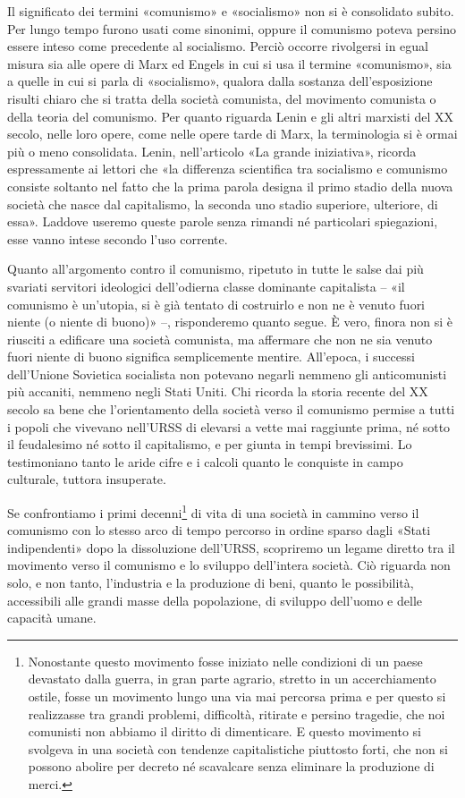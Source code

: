 \documentclass[12pt,a4paper,openany]{book}
\begin{document}
Il significato dei termini «comunismo» e «socialismo» non si è consolidato subito. Per lungo tempo furono usati come sinonimi, oppure il comunismo poteva persino essere inteso come precedente al socialismo. Perciò occorre rivolgersi in egual misura sia alle opere di Marx ed Engels in cui si usa il termine «comunismo», sia a quelle in cui si parla di «socialismo», qualora dalla sostanza dell'esposizione risulti chiaro che si tratta della società comunista, del movimento comunista o della teoria del comunismo. Per quanto riguarda Lenin e gli altri marxisti del XX secolo, nelle loro opere, come nelle opere tarde di Marx, la terminologia si è ormai più o meno consolidata. Lenin, nell'articolo «La grande iniziativa», ricorda espressamente ai lettori che «la differenza scientifica tra socialismo e comunismo consiste soltanto nel fatto che la prima parola designa il primo stadio della nuova società che nasce dal capitalismo, la seconda uno stadio superiore, ulteriore, di essa». Laddove useremo queste parole senza rimandi né particolari spiegazioni, esse vanno intese secondo l'uso corrente.

Quanto all'argomento contro il comunismo, ripetuto in tutte le salse dai più svariati servitori ideologici dell'odierna classe dominante capitalista – «il comunismo è un'utopia, si è già tentato di costruirlo e non ne è venuto fuori niente (o niente di buono)» –, risponderemo quanto segue. È vero, finora non si è riusciti a edificare una società comunista, ma affermare che non ne sia venuto fuori niente di buono significa semplicemente mentire. All'epoca, i successi dell'Unione Sovietica socialista non potevano negarli nemmeno gli anticomunisti più accaniti, nemmeno negli Stati Uniti. Chi ricorda la storia recente del XX secolo sa bene che l'orientamento della società verso il comunismo permise a tutti i popoli che vivevano nell'URSS di elevarsi a vette mai raggiunte prima, né sotto il feudalesimo né sotto il capitalismo, e per giunta in tempi brevissimi. Lo testimoniano tanto le aride cifre e i calcoli quanto le conquiste in campo culturale, tuttora insuperate.

Se confrontiamo i primi decenni\footnote{Nonostante questo movimento fosse iniziato nelle condizioni di un paese devastato dalla guerra, in gran parte agrario, stretto in un accerchiamento ostile, fosse un movimento lungo una via mai percorsa prima e per questo si realizzasse tra grandi problemi, difficoltà, ritirate e persino tragedie, che noi comunisti non abbiamo il diritto di dimenticare. E questo movimento si svolgeva in una società con tendenze capitalistiche piuttosto forti, che non si possono abolire per decreto né scavalcare senza eliminare la produzione di merci.} di vita di una società in cammino verso il comunismo con lo stesso arco di tempo percorso in ordine sparso dagli «Stati indipendenti» dopo la dissoluzione dell'URSS, scopriremo un legame diretto tra il movimento verso il comunismo e lo sviluppo dell'intera società. Ciò riguarda non solo, e non tanto, l'industria e la produzione di beni, quanto le possibilità, accessibili alle grandi masse della popolazione, di sviluppo dell'uomo e delle capacità umane.
\end{document}
